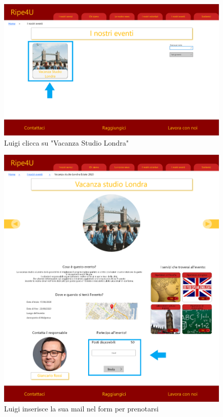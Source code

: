     \begin{figure}[H]
        \centering
        \includegraphics[scale=0.3]{resources/images/scenario2-3.png}
        \caption{Luigi clicca su "Vacanza Studio Londra"}
    \end{figure}
    \begin{figure}[H]
        \centering
        \includegraphics[scale=0.3]{resources/images/scenario2-4.png}
        \caption{Luigi inserisce la sua mail nel form per prenotarsi}
    \end{figure}
